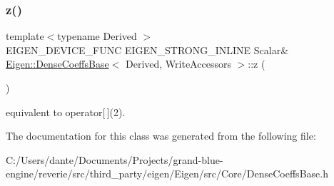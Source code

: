 \subsubsection{\texorpdfstring{z()}{z()}}
{\footnotesize\ttfamily template$<$typename Derived $>$ \\
E\+I\+G\+E\+N\+\_\+\+D\+E\+V\+I\+C\+E\+\_\+\+F\+U\+NC E\+I\+G\+E\+N\+\_\+\+S\+T\+R\+O\+N\+G\+\_\+\+I\+N\+L\+I\+NE Scalar\& \mbox{\hyperlink{class_eigen_1_1_dense_coeffs_base}{Eigen\+::\+Dense\+Coeffs\+Base}}$<$ Derived, Write\+Accessors $>$\+::z (\begin{DoxyParamCaption}{ }\end{DoxyParamCaption})\hspace{0.3cm}{\ttfamily [inline]}}

equivalent to operator\mbox{[}$\,$\mbox{]}(2). 

The documentation for this class was generated from the following file\+:\begin{DoxyCompactItemize}
\item 
C\+:/\+Users/dante/\+Documents/\+Projects/grand-\/blue-\/engine/reverie/src/third\+\_\+party/eigen/\+Eigen/src/\+Core/Dense\+Coeffs\+Base.\+h\end{DoxyCompactItemize}
